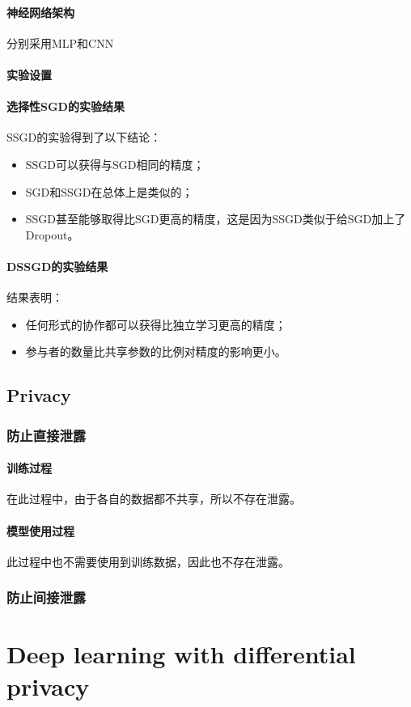 \documentclass[12pt,a4paper]{article}
\begin{document}
\paragraph{神经网络架构} 分别采用MLP和CNN
\paragraph{实验设置} 
\paragraph{选择性SGD的实验结果} SSGD的实验得到了以下结论：
\begin{itemize}
	\item SSGD可以获得与SGD相同的精度；
	\item SGD和SSGD在总体上是类似的；
	\item SSGD甚至能够取得比SGD更高的精度，这是因为SSGD类似于给SGD加上了Dropout。
\end{itemize}
\paragraph{DSSGD的实验结果} 结果表明：
\begin{itemize}
	\item 任何形式的协作都可以获得比独立学习更高的精度；
	\item 参与者的数量比共享参数的比例对精度的影响更小。
\end{itemize}
\subsection{Privacy}
\subsubsection{防止直接泄露}
\paragraph{训练过程} 在此过程中，由于各自的数据都不共享，所以不存在泄露。
\paragraph{模型使用过程} 此过程中也不需要使用到训练数据，因此也不存在泄露。

\subsubsection{防止间接泄露}

\section{Deep learning with differential privacy\cite{abadi2016deep} }
\end{document}
